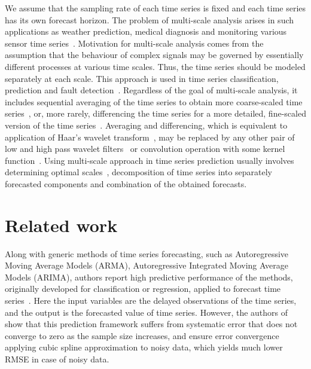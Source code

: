 \documentclass[conference]{IEEEtran}
\begin{document}
We assume that the sampling rate of each time series is fixed and each time series has its own forecast horizon. The problem of multi-scale analysis arises in such applications as weather prediction, medical diagnosis and monitoring various sensor time series~\cite{Costa2008, Ahmed2012, Cortez2012, Ferreira2006}. Motivation for multi-scale analysis comes from the assumption that the behaviour of complex signals may be governed by  essentially different processes at various time scales. Thus, the time series should be modeled separately at each scale. This approach is used in time series classification, prediction and fault detection~\cite{Cui2016, Cortez2012, Aldrich2013}. Regardless of the goal of multi-scale analysis, it includes sequential averaging of the time series to obtain more coarse-scaled time series~\cite{Wu2013}, or, more rarely, differencing the time series for a more detailed, fine-scaled version of the time series~\cite{Jiang2011}. Averaging and differencing, which is equivalent to application of Haar's wavelet transform~\cite{Jiang2011}, may be replaced by any other pair of low and high pass wavelet filters~\cite{Chen2004} or convolution operation with some kernel function~\cite{Vespier2012}. Using multi-scale approach in time series prediction usually involves determining optimal scales~\cite{Vespier2012, Ahmed2012}, decomposition of time series into separately forecasted components and combination of the obtained forecasts.


\section{Related work}
 Along with generic methods of time series forecasting, such as Autoregressive Moving Average Models (ARMA), Autoregressive Integrated Moving Average Models (ARIMA), authors report high predictive performance of the methods, originally developed for classification or regression, applied to forecast time series~\cite{Yu2016, Kane2014, Trafalis2000, Navarrete2015, Busseti2012, Taylor2009}.  Here the input variables are the delayed observations  of the time series, and the output is the forecasted value of time series. However, the authors of~\cite{Navarrete2015} show that this prediction framework suffers from systematic error that does not converge to zero as the sample size increases, and  ensure error convergence applying cubic spline approximation to noisy data, which yields much lower RMSE in case of noisy data.
\end{document}
